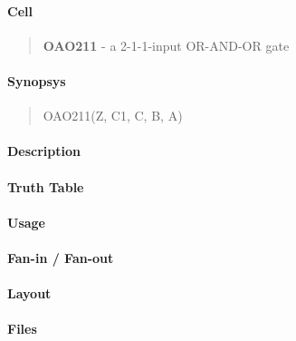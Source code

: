 \label{OAO211}
\paragraph{Cell}
\begin{quote}
    \textbf{OAO211} - a 2-1-1-input OR-AND-OR gate
\end{quote}

\paragraph{Synopsys}
\begin{quote}
    OAO211(Z, C1, C, B, A)
\end{quote}

\paragraph{Description}

%

\paragraph{Truth Table}
%

\paragraph{Usage}

\paragraph{Fan-in / Fan-out}

\paragraph{Layout}

\paragraph{Files}
